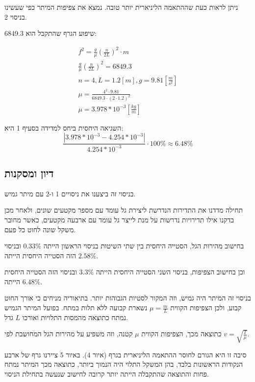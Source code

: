 \documentclass[14pt]{extarticle}
\begin{document}
ניתן לראות כעת שההתאמה הליניארית יותר טובה. נמצא את צפיפות המיתר כפי שעשינו בניסוי 2.

שיפוע הגרף שהתקבל הוא 6849.3:

\begin{center}
    \begin{equation*}
        \begin{aligned}
            f^2 = \frac{g}{\mu} (\frac{n}{2L})^2 \cdot m               \\
            \frac{g}{\mu} (\frac{n}{2L})^2 = 6849.3                   \\
            n=4, L=1.2[m], g=9.81[\frac{m}{s^2}]                       \\
            \mu = \frac{4^2 \cdot 9.81}{6849.3 \cdot (2 \cdot 1.2)^2} \\
            \mu = 3.978 * 10^{-3} [\frac{kg}{m}]
        \end{aligned}
    \end{equation*}
\end{center}

השגיאה היחסית ביחס למדידה בסעיף 1 היא:
\begin{equation*}
\frac{|3.978 * 10^{-3} - 4.254 * 10^{-3}|}{4.254 * 10^{-3}} \cdot 100\% \approx 6.48\%
\end{equation*}

\subsection*{דיון ומסקנות}
בניסוי זה ביצענו את ניסויים 1 ו-2 עם מיתר גמיש.

תחילה מדדנו את התדירות הנדרשת ליצירת  גל עומד עם מספר מקטעים שונים, ולאחר מכן בדקנו אילו תדירויות נדרשות על מנת לייצר גל עומד עם ארבעה מקטעים, כאשר מחובר משקל שונה לחוט כל פעם.

בחישוב מהירות הגל, הסטייה היחסית בין שתי השיטות בניסוי הראשון הייתה $0.33\%$ ובניסוי הזה הסטייה היחסית הייתה $2.58\%$.

וכן בחישוב הצפיפות, בניסוי השני הסטייה היחסית הייתה $3.3\%$ ובניסוי הזה הסטייה היחסית הייתה $6.48\%$.

בניסוי זה המיתר היה גמיש, וזה המקור לסטיות הגבוהות יותר. בתיאוריה מניחים כי אורך החוט קבוע, ולכן הצפיפות הקווית $\mu=\frac{m}{L}$ נשארת קבועה ללא תלות במתח. בפועל המיתר הגמיש נמתח כתוצאה מהמסות התלויות ואורכו $L$ גדל.

כתוצאה מכך, הצפיפות הקווית $\mu$ קטנה, וזה משפיע על מהירות הגל המחושבת לפי $v=\sqrt{\frac{T}{\mu}}$.

סיבה זו היא הגורם לחוסר ההתאמה הליניארית בגרף (איור 4). באיור 5 ציירנו גרף של ארבע הנקודות הראשונות בלבד, בהן המשקל התלוי היה הנמוך ביותר, כתוצאה מכך המיתר נמתח פחות והתוצאה שהתקבלה הייתה יותר קרובה לחישוב שנעשה בתחילת הניסוי.
\end{document}
